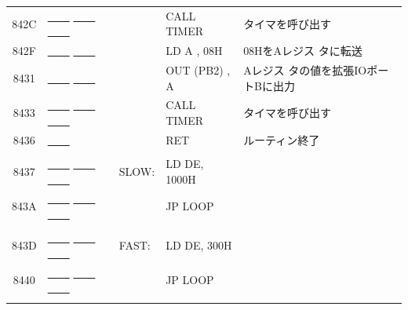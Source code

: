 \begin{description}
\begin{table}
\begin{center}
\begin{tabular}{|c|l|ll|l|}
   842C & \underline{~~~~} \underline{~~~~} \underline{~~~~}  &  &     CALL
                TIMER&タイマを呼び出す\\
   842F & \underline{~~~~} \underline{~~~~}     &  &     LD A , 08H& 08HをAレジス
                    タに転送\\
   8431 & \underline{~~~~} \underline{~~~~}     &  &     OUT (PB2) , A & Aレジス
                    タの値を拡張IOポートBに出力\\
   8433 & \underline{~~~~} \underline{~~~~} \underline{~~~~}  &  &     CALL TIMER&タイマを呼び出す\\
   8436 & \underline{~~~~}       &  &     RET& ルーティン終了\\
        &          &  &     &\\
   8437 & \underline{~~~~} \underline{~~~~} \underline{~~~~}  &  SLOW:& LD DE, 1000H&\\
   843A & \underline{~~~~} \underline{~~~~} \underline{~~~~} &  &     JP LOOP&\\
        &          &  & &\\
   843D & \underline{~~~~} \underline{~~~~} \underline{~~~~} &  FAST:& LD DE, 300H&\\
   8440 & \underline{~~~~} \underline{~~~~} \underline{~~~~} &  &     JP LOOP&\\
        &          &  &     &\\

\hline
\end{tabular}
\end{center}
\end{table}



\end{description}
